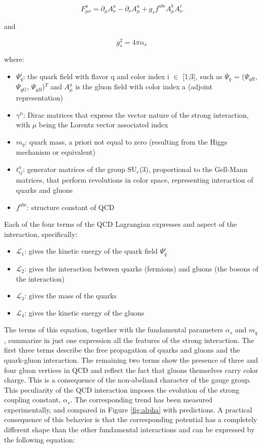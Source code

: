 \begin{equation}\label{label:F}
F_{\mu\nu}^{a} = \partial_{\mu}A_{\nu}^{a} - \partial_{\nu}A_{\mu}^{a} + g_{s}f^{abc}A_{\mu}^{b}A_{\nu}^{c} \end{equation}

and

\begin{equation}\label{label:g}
g_{s}^{2} = 4\pi\alpha_{s}
\end{equation}

where:

\begin{itemize}
\item $\Psi_{q}^{i}$: the quark field with flavor q and color index i $\in$ [1;3], such as $\Psi_{q}$ = ($\Psi_{qR}$, $\Psi_{qG}$, $\Psi_{qB}$)$^{T}$ and $A_{\mu}^{a}$ is the gluon field with color index a (adjoint representation)
\item $\gamma^{\mu}$: Dirac matrices that express the vector nature of the strong interaction, with $\mu$ being the Lorentz vector associated index
\item $m_{q}$: quark mass, a priori not equal to zero (resulting from the Higgs mechanism or equivalent)
\item $t_{ij}^{a}$: generator matrices of the group SU$_{c}$(3), proportional to the Gell-Mann matrices, that perform revolutions in color space, representing interaction of quarks and gluons
\item $f^{abc}$: structure constant of QCD
\end{itemize}

Each of the four terms of the QCD Lagrangian expresses and aspect of the interaction, specifically:

\begin{itemize}
\item $\mathcal{L}_{1}$: gives the kinetic energy of the quark field $\Psi_{q}^{i}$
\item $\mathcal{L}_{2}$: gives the interaction between quarks (fermions) and gluons (the bosons of the interaction)
\item $\mathcal{L}_{3}$: gives the mass of the quarks
\item $\mathcal{L}_{4}$: gives the kinetic energy of the gluons
\end{itemize}

The terms of this equation, together with the fundamental parameters $\alpha_{s}$ and $m_{q}$, summarize in just one expression all the features of the strong interaction. 
The first three terms describe the free propagation of quarks and gluons and the quark-gluon interaction. The remaining two terms show the presence of three and four gluon vertices in QCD and reflect the fact that gluons themselves carry color charge. This is a consequence of the non-abelian4 character of the gauge group.
This peculiarity of the QCD interaction imposes the evolution of the strong coupling constant, $\alpha_{s}$. The corresponding trend has been measured experimentally, and compared in Figure \ref{fig:alpha} with predictions. A practical consequence of this behavior is that the corresponding potential has a completely different shape than the other fundamental interactions and can be expressed by the following equation:


